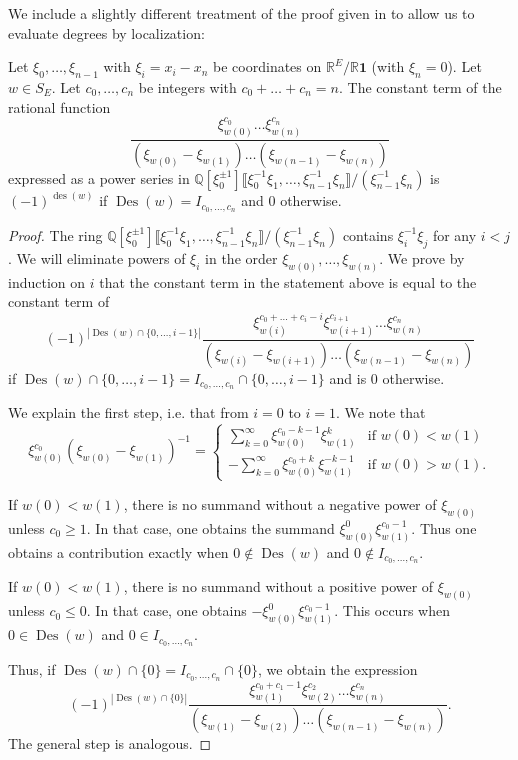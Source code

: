 \documentclass[ALCO,published]{cedram}
\numberwithin{equation}{section}
\numberwithin{figure}{section}
\newcommand{\Q}{\mathbb{Q}}
\newcommand{\R}{\mathbb{R}}
\DeclareMathOperator{\Des}{Des}
\DeclareMathOperator{\des}{des}
\newcommand*\ps[1]{{\llbracket#1\rrbracket}}
\begin{document}
We include a slightly different treatment of the proof given in \cite[Proposition~3.5]{Postnikov:permutohedra} to allow us to evaluate degrees by localization:
\begin{lemma} \label{l:localizationevaluation}
    Let $\xi_0,\dots,\xi_{n-1}$ with $\xi_i=x_i-x_n$ be coordinates on $\R^{E}/\R\mathbf{1}$ (with $\xi_n=0$). Let $w\in S_{E}$. Let $c_0,\dots,c_n$ be  integers with $c_0+\dots+c_n=n$. The constant term of the rational function
    \[\frac{\xi_{w(0)}^{c_0}\dots\xi_{w(n)}^{c_n}}{(\xi_{w(0)}-\xi_{w(1)})\dots (\xi_{w(n-1)}-\xi_{w(n)})}\]
    expressed as a power series in $\Q[\xi^{\pm 1}_0]\ps{\xi_0^{-1}\xi_1,\dots,\xi_{n-1}^{-1}\xi_n}/(\xi_{n-1}^{-1}\xi_n)$
    is $(-1)^{\des(w)}$ if $\Des(w)=I_{c_0,\dots,c_n}$ and $0$ otherwise.
\end{lemma}

\begin{proof}
    The ring $\Q[\xi_0^{\pm 1}]\ps{\xi_0^{-1}\xi_1,\dots,\xi_{n-1}^{-1}\xi_n}/(\xi_{n-1}^{-1}\xi_n)$ contains $\xi_i^{-1}\xi_j$ for any $i<j$. We will eliminate powers of $\xi_i$ in the order $\xi_{w(0)},\dots,\xi_{w(n)}$.
    We prove by induction on $i$ that the constant term in the statement above is equal to the constant term of
    \[(-1)^{|\Des(w)\cap \{0,\dots,i-1\}|}\frac{\xi_{w(i)}^{c_0+\dots+c_i-i}\xi_{w(i+1)}^{c_{i+1}}\dots\xi_{w(n)}^{c_n}}{(\xi_{w(i)}-\xi_{w(i+1)})\dots (\xi_{w(n-1)}-\xi_{w(n)})}\]
    if $\Des(w)\cap \{0,\dots,i-1\}=I_{c_0,\dots,c_n}\cap \{0,\dots,i-1\}$ and is $0$ otherwise.

    We explain the first step, i.e. that from $i=0$ to $i=1$.
    We note that
    \[\xi_{w(0)}^{c_0}(\xi_{w(0)}-\xi_{w(1)})^{-1}=
    \begin{cases}
        \sum_{k=0}^\infty \xi_{w(0)}^{c_0-k-1}\xi_{w(1)}^k &\text{if }w(0)<w(1)\\
        -\sum_{k=0}^\infty \xi_{w(0)}^{c_0+k}\xi_{w(1)}^{-k-1} &\text{if }w(0)>w(1).
    \end{cases}
    \]
    
    If $w(0)<w(1)$, there is no summand without a negative power of $\xi_{w(0)}$ unless $c_0\geq 1$. In that case, one obtains the summand $\xi_{w(0)}^0\xi_{w(1)}^{c_0-1}$. Thus one obtains a contribution exactly when $0\not\in \Des(w)$ and $0\not\in I_{c_0,\dots,c_n}$.

    If $w(0)<w(1)$, there is no summand without a positive power of $\xi_{w(0)}$ unless $c_0\leq 0$. In that case, one
    obtains $-\xi_{w(0)}^0\xi_{w(1)}^{c_0-1}$. This occurs when $0\in \Des(w)$ and $0\in I_{c_0,\dots,c_n}$.

    Thus, if $\Des(w)\cap \{0\}=I_{c_0,\dots,c_n}\cap \{0\}$, we obtain the expression
    \[(-1)^{|\Des(w)\cap \{0\}|}\frac{\xi_{w(1)}^{c_0+c_1-1}\xi_{w(2)}^{c_{2}}\dots\xi_{w(n)}^{c_n}}{(\xi_{w(1)}-\xi_{w(2)})\dots (\xi_{w(n-1)}-\xi_{w(n)})}.\]
    The general step is analogous.
\end{proof}
\end{document}
